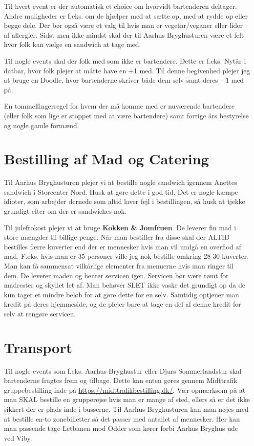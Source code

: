 Til hvert event er der automatisk et choice om hvorvidt bartenderen deltager. Andre muligheder er f.eks. om de hjælper med at sætte op, med at rydde op eller begge dele. Der bør også være et valg til hvis man er vegetar/veganer eller lider af allergier. Sidst men ikke mindst skal der til Aarhus Bryghusturen være et felt hvor folk kan vælge en sandwich at tage med.

Til nogle events skal der folk med som ikke er bartendere. Dette er f.eks. Nytår i datbar, hvor folk plejer at måtte have en +1 med. Til denne begivenhed plejer jeg at bruge en Doodle, hvor bartenderne skriver både dem selv samt deres +1 med på.

En tommelfingerregel for hvem der må komme med er nuværende bartendere (eller folk som lige er stoppet med at være bartendere) samt forrige års bestyrelse og nogle gamle formænd.

\section*{Bestilling af Mad og Catering}
Til Aarhus Bryghusturen plejer vi at bestille nogle sandwich igennem Anettes sandwich i Storcenter Nord. Husk at gøre dette i god tid. Det er nogle kæmpe idioter, som arbejder dernede som altid laver fejl i bestillingen, så husk at tjekke grundigt efter om der er sandwiches nok.

Til julefrokost plejer vi at bruge \textbf{Kokken \& Jomfruen}. De leverer fin mad i store mængder til billige penge. Når man bestiller fra disse skal der ALTID bestilles færre kuverter end der er mennesker hvis man vil undgå en overflod af mad. F.eks. hvis man er 35 personer ville jeg nok bestille omkring 28-30 kuverter. Man kan få sammensat vilkårlige elementer fra menuerne hvis man ringer til dem. De leverer maden og henter servicen igen. Servicen bør være tømt for madrester og skyllet let af. Man behøver SLET ikke vaske det grundigt op da de kun tager et mindre beløb for at gøre dette for en selv. Samtidig optjener man kredit på deres hjemmeside, og de plejer bare at tage en del af denne kredit for selv at rengøre servicen.

\section*{Transport}
Til nogle events som f.eks. Aarhus Bryghustur eller Djurs Sommerlandstur skal bartenderne fragtes frem og tilbage. Dette kan enten gøres gennem Midttrafik gruppebestilling inde på \url{https://midttrafikbestilling.dk/}. Vær opmærksom på at man SKAL bestille en grupperejse hvis man er mange af sted, ellers så er det ikke sikkert der er plads inde i busserne. Til Aarhus Bryghusturen kan man nøjes med at bestille en-to zonebilletter så det passer med antallet af mennesker. Her kan man passende tage Letbanen mod Odder som kører forbi Aarhus Bryghus ude ved Viby. 

